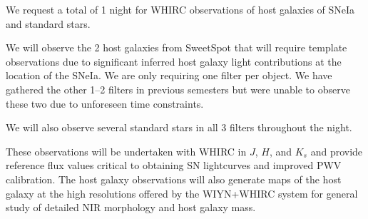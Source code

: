 \documentclass[11pt]{article}
\begin{document}
\clearpage


%

%

\expdesign

We request a total of 1 night for WHIRC observations of host galaxies of SNeIa and standard stars.  

We will observe the 2 host galaxies from SweetSpot that will
require template observations due to significant inferred host galaxy light contributions at the location of the SNeIa.
We are only requiring one filter per object. 
We have gathered the other 1--2 filters in previous semesters but were unable to observe these two due to unforeseen time constraints. 

We will also observe several standard stars in all 3 filters throughout the night.

These observations will be undertaken with WHIRC in $J$, $H$, and $K_s$
and provide reference flux values critical to obtaining
SN lightcurves and improved PWV calibration.  
The host galaxy observations will also generate
maps of the host galaxy at the high resolutions offered by the WIYN+WHIRC system for general study of detailed NIR morphology and host galaxy mass.

% 

\end{document}
